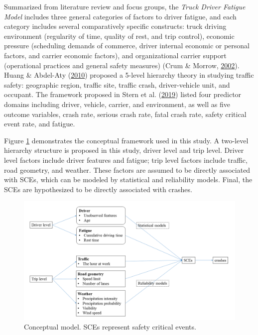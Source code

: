 \documentclass[12pt]{book}
\numberwithin{equation}{chapter}
\begin{document}
Summarized from literature review and focus groups, the \emph{Truck Driver Fatigue Model} includes three general categories of factors to driver fatigue, and each category includes several comparatively specific constructs: truck driving environment (regularity of time, quality of rest, and trip control), economic pressure (scheduling demands of commerce, driver internal economic or personal factors, and carrier economic factors), and organizational carrier support (operational practices and general safety measures) (Crum \& Morrow, \protect\hyperlink{ref-crum2002influence}{2002}). Huang \& Abdel-Aty (\protect\hyperlink{ref-huang2010multilevel}{2010}) proposed a 5-level hierarchy theory in studying traffic safety: geographic region, traffic site, traffic crash, driver-vehicle unit, and occupant. The framework proposed in Stern et al. (\protect\hyperlink{ref-stern2019data}{2019}) listed four predictor domains including driver, vehicle, carrier, and environment, as well as five outcome variables, crash rate, serious crash rate, fatal crash rate, safety critical event rate, and fatigue.

Figure \ref{fig:conceptmodel} demonstrates the conceptual framework used in this study. A two-level hierarchy structure is proposed in this study, driver level and trip level. Driver level factors include driver features and fatigue; trip level factors include traffic, road geometry, and weather. These factors are assumed to be directly associated with SCEs, which can be modeled by statistical and reliability models. Final, the SCEs are hypothesized to be directly associated with crashes.

\begin{figure}[h]

{\centering \includegraphics[width=\linewidth]{figs/conceptual_model} 

}

\caption{Conceptual model. SCEs represent safety critical events.}\label{fig:conceptmodel}
\end{figure}
\end{document}

